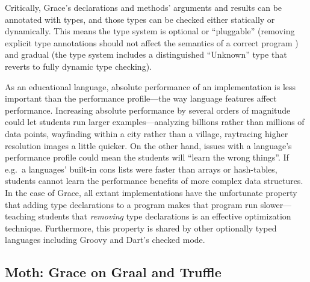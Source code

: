 Critically, Grace's declarations and methods' arguments
and results can be annotated with types, and those types can be  checked
either statically or dynamically. This means the type system is
optional or ``pluggable'' \citep{GiladPluggable2004} (removing explicit
type annotations should not affect the semantics of a correct
program \citep{Siek2015}) and gradual (the type system
includes a distinguished ``Unknown'' type that reverts to fully 
dynamic type checking).

As an educational language\citep{panel}, absolute performance of an
implementation is less important than the performance profile---the
way language features affect performance.  Increasing absolute
performance by several orders of magnitude could let students run
larger examples---analyzing billions rather than millions of data
points, wayfinding within a city rather than a village, raytracing
higher resolution images a little quicker.  On the other hand, issues
with a language's performance profile could mean the students will
``learn the wrong things''.  If e.g.\ a languages' built-in cons lists
were faster than arrays or hash-tables, students cannot learn the
performance benefits of more complex data structures. In the case of
Grace, all extant implementations have the unfortunate property that
adding type declarations to a program makes that program run slower---teaching students that \emph{removing} type declarations is an
effective optimization technique.
Furthermore, this property is shared
by other optionally typed languages including Groovy\citep{Muehlboeck2017} and 
Dart's checked mode\citep{dartbook}.



\subsection{Moth: Grace on Graal and Truffle}
\label{ssec:moth}


